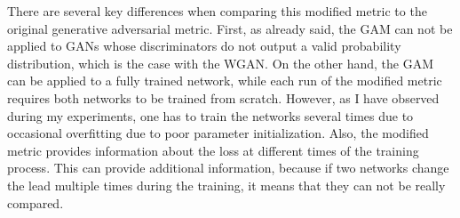 There are several key differences when comparing this modified metric to the original generative adversarial metric. First, as already said, the GAM can not be applied to GANs whose discriminators do not output a valid probability distribution, which is the case with the WGAN. On the other hand, the GAM can be applied to a fully trained network, while each run of the modified metric requires both networks to be trained from scratch. However, as I have observed during my experiments, one has to train the networks several times due to occasional overfitting due to poor parameter initialization. Also, the modified metric provides information about the loss at different times of the training process. This can provide additional information, because if two networks change the lead multiple times during the training, it means that they can not be really compared.  

